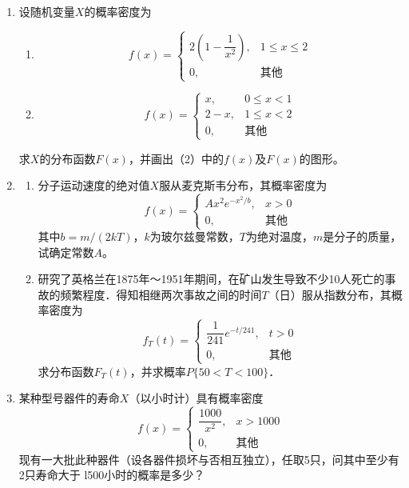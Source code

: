 \begin{enumerate}
    \item 设随机变量$X$的概率密度为
    \begin{enumerate}
        \item $$
            f(x)=\left\{\begin{array}{ll}
                2(1-\dfrac{1}{x^2}), & 1\leq x\leq 2\\
                0, & \mbox{其他} 
            \end{array}\right.
        $$
        \item $$
        f(x)=\left\{\begin{array}{ll}
            x, & 0\leq x <1\\
            2-x, & 1\leq x <2\\
            0, & \mbox{其他} 
        \end{array}\right.
        $$
    \end{enumerate}
    求$X$的分布函数$F(x)$，并画出（2）中的$f(x)$及$F(x)$的图形。

    \item \begin{enumerate}
        \item 分子运动速度的绝对值$X$服从麦克斯韦分布，其概率密度为
        $$f(x)=\left\{\begin{array}{ll}
            Ax^2e^{-x^2/b}, & x>0\\
            0, & \mbox{其他}
        \end{array}\right.$$
        其中$b=m/(2kT)$，$k$为玻尔兹曼常数，$T$为绝对温度，$m$是分子的质量，试确定常数$A$。
        \item 研究了英格兰在1875年～1951年期间，在矿山发生导致不少10人死亡的事
        故的频繁程度．得知相继两次事故之间的时间$T$（日）服从指数分布，其概率密度为
        $$f_T(t)=\left\{\begin{array}{ll}
            \dfrac{1}{241}e^{-t/241}, & t>0\\
            0, & \mbox{其他}
        \end{array}\right.$$
        求分布函数$F_T(t)$，并求概率$P\{50<T<100\}$．
    \end{enumerate}
    

    \item 某种型号器件的寿命$X$（以小时计）具有概率密度
    $$f(x)=\left\{\begin{array}{ll}
        \dfrac{1000}{x^2}, & x>1000\\
        0, & \mbox{其他}
    \end{array}\right.$$
    现有一大批此种器件（设各器件损坏与否相互独立），任取5只，问其中至少有2只寿命大于
    l500小时的概率是多少？



\end{enumerate}
